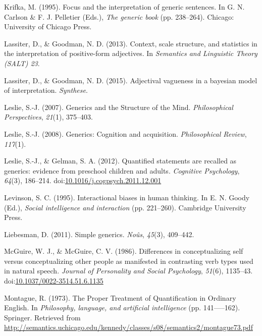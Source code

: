 \documentclass[english,,man,floatsintext]{apa6}
\theoremstyle{definition}
\theoremstyle{definition}
\theoremstyle{definition}
\theoremstyle{remark}
\begin{document}
\leavevmode\hypertarget{ref-KrifkaGenericBookFocus}{}%
Krifka, M. (1995). Focus and the interpretation of generic sentences. In
G. N. Carlson \& F. J. Pelletier (Eds.), \emph{The generic book} (pp.
238--264). Chicago: University of Chicago Press.

\leavevmode\hypertarget{ref-Lassiter2013}{}%
Lassiter, D., \& Goodman, N. D. (2013). Context, scale structure, and
statistics in the interpretation of positive-form adjectives. In
\emph{Semantics and Linguistic Theory (SALT) 23}.

\leavevmode\hypertarget{ref-Lassiter2015}{}%
Lassiter, D., \& Goodman, N. D. (2015). Adjectival vagueness in a
bayesian model of interpretation. \emph{Synthese}.

\leavevmode\hypertarget{ref-Leslie2007}{}%
Leslie, S.-J. (2007). Generics and the Structure of the Mind.
\emph{Philosophical Perspectives}, \emph{21}(1), 375--403.

\leavevmode\hypertarget{ref-Leslie2008}{}%
Leslie, S.-J. (2008). Generics: Cognition and acquisition.
\emph{Philosophical Review}, \emph{117}(1).

\leavevmode\hypertarget{ref-Leslie2012}{}%
Leslie, S.-J., \& Gelman, S. A. (2012). Quantified statements are
recalled as generics: evidence from preschool children and adults.
\emph{Cognitive Psychology}, \emph{64}(3), 186--214.
doi:\href{https://doi.org/10.1016/j.cogpsych.2011.12.001}{10.1016/j.cogpsych.2011.12.001}

\leavevmode\hypertarget{ref-Levinson1995}{}%
Levinson, S. C. (1995). Interactional biases in human thinking. In E. N.
Goody (Ed.), \emph{Social intelligence and interaction} (pp. 221--260).
Cambridge University Press.

\leavevmode\hypertarget{ref-Liebesman2011}{}%
Liebesman, D. (2011). Simple generics. \emph{Noûs}, \emph{45}(3),
409--442.

\leavevmode\hypertarget{ref-McGuire1986}{}%
McGuire, W. J., \& McGuire, C. V. (1986). Differences in conceptualizing
self versus conceptualizing other people as manifested in contrasting
verb types used in natural speech. \emph{Journal of Personality and
Social Psychology}, \emph{51}(6), 1135--43.
doi:\href{https://doi.org/10.1037/0022-3514.51.6.1135}{10.1037/0022-3514.51.6.1135}

\leavevmode\hypertarget{ref-Montague1973}{}%
Montague, R. (1973). The Proper Treatment of Quantification in Ordinary
English. In \emph{Philosophy, language, and artificial intelligence}
(pp. 141-----162). Springer. Retrieved from
\url{http://semantics.uchicago.edu/kennedy/classes/s08/semantics2/montague73.pdf}
\end{document}
